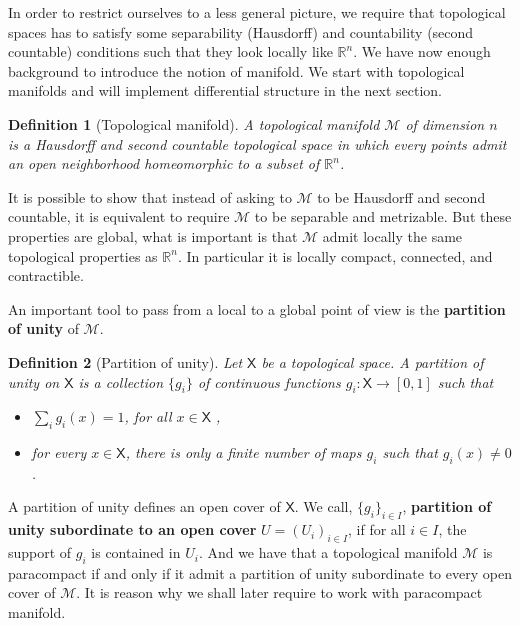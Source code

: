 \documentclass[10pt]{book}
\newcommand{\Mcal}{\mathcal{M}}
\newcommand{\Rbb}{\mathbb{R}}
\newcommand{\Xsf}{\mathsf{X}}
\theoremstyle{break}
\newtheorem{definition}{Definition}
\begin{document}
In order to restrict ourselves to a less general picture, we require that topological spaces has to satisfy some separability (Hausdorff) and countability (second countable) conditions such that they look locally like $\Rbb^n$. We have now enough background to introduce the notion of manifold. We start with topological manifolds and will implement differential structure in the next section.%


\begin{definition}[Topological manifold]
A topological manifold $\Mcal$ of dimension $n$ is a Hausdorff and second countable topological space in which every points admit an open neighborhood homeomorphic to a subset of $\Rbb^n$.
\end{definition}


It is possible to show that instead of asking to $\Mcal$ to be Hausdorff and second countable, it is equivalent to require $\Mcal$ to be separable and metrizable. But these properties are global, what is important is that $\Mcal$ admit locally the same topological properties as $\Rbb^n$. In particular it is locally compact, connected, and contractible.%


\bigskip


An important tool to pass from a local to a global point of view is the \textbf{partition of unity} of $\Mcal$. 


\begin{definition}[Partition of unity]
Let $\Xsf$ be a topological space. A partition of unity on $\Xsf$ is a collection $\{g_i\}$ of continuous functions $g_i : \Xsf \to [0,1]$ such that
%
\begin{itemize}
\item $\sum_i g_i(x) = 1$, for all $x \in \Xsf$ ,
\item for every $x \in \Xsf$, there is only a finite number of maps $g_i$ such that $g_i(x) \neq 0$.
\end{itemize}
%
\end{definition}


A partition of unity defines an open cover of $\Xsf$. We call, $\{g_i\}_{i \in I}$, \textbf{partition of unity subordinate to an open cover} $U=(U_i)_{i \in I}$, if for all $i \in I$, the support of $g_i$ is contained in $U_i$. And we have that a topological manifold $\Mcal$ is paracompact if and only if it admit a partition of unity subordinate to every open cover of $\Mcal$. It is reason why we shall later require to work with paracompact manifold.
\end{document}
